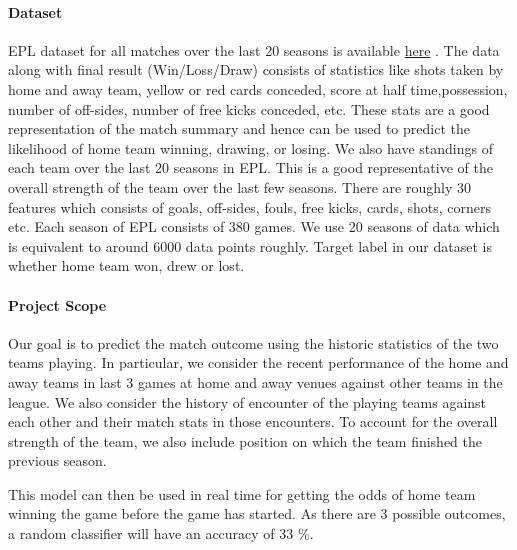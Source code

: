 \documentclass{article}
\begin{document}
\paragraph{Dataset}
EPL dataset for all matches over the last 20 seasons is available 
\href{https://www.kaggle.com/saife245/english-premier-league}{here} \cite{data} . The data along with final result (Win/Loss/Draw) consists of statistics like shots taken by home and away team, yellow or red cards conceded, score at half time,possession, number of off-sides, number of free kicks conceded, etc. These stats are a good representation of the match summary and hence can be used to predict the likelihood of home team winning, drawing, or losing. We also have standings of each team over the last 20 seasons in EPL. This is a good representative of the overall strength of the team over the last few seasons. 
There are roughly 30 features which consists of goals, off-sides, fouls, free kicks, cards, shots, corners etc. Each season of EPL consists of 380 games. We use 20 seasons of data which is equivalent to around 6000 data points roughly. Target label in our dataset is whether home team won, drew or lost.

\paragraph{Project Scope}
Our goal is to  predict the match outcome using the historic statistics of the two teams playing. In particular, we consider the recent performance of the home and away teams in last 3 games at home and away venues against other teams in the league. We also consider the history of encounter of the playing teams against each other and their match stats in those encounters. To account for the overall strength of the team, we also include position on which the team finished the previous season. 

This model can then be used in real time for getting the odds of home team winning the game before the game has started. As there are 3 possible outcomes, a random classifier will have an accuracy of 33 \%. 
\end{document}
